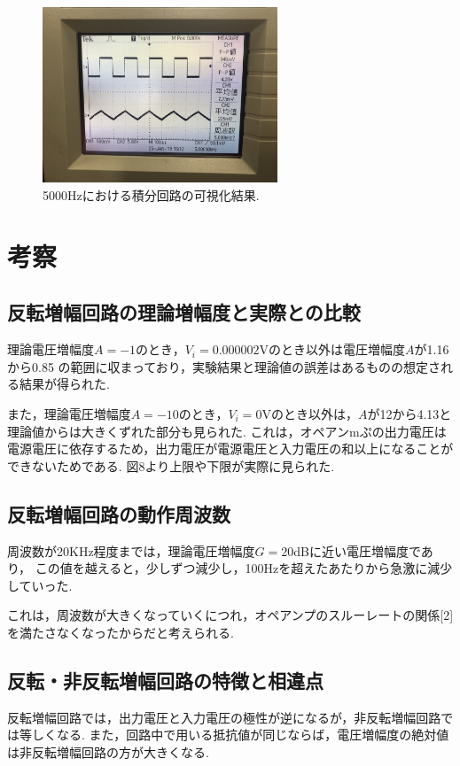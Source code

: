 \documentclass[twocolumn, 10pt,a4j]{jsarticle}
\begin{document}
        \begin{figure}[]
          \begin{center}
              \includegraphics[width=7cm]{../img/result_sekibun_5000Hz.jpg}
              \caption{5000Hzにおける積分回路の可視化結果.}
          \end{center}
        \end{figure}

\section{考察}
      \subsection{反転増幅回路の理論増幅度と実際との比較}
        理論電圧増幅度$A=-1$のとき，$V_{i} = 0.000002$Vのとき以外は電圧増幅度$A$が1.16から0.85
        の範囲に収まっており，実験結果と理論値の誤差はあるものの想定される結果が得られた.

        また，理論電圧増幅度$A=-10$のとき，$V_{i} = 0$Vのとき以外は，$A$が12から4.13と理論値からは大きくずれた部分も見られた.
        これは，オペアンmぷの出力電圧は電源電圧に依存するため，出力電圧が電源電圧と入力電圧の和以上になることができないためである.
        図8より上限や下限が実際に見られた. 

      \subsection{反転増幅回路の動作周波数}
        周波数が20KHz程度までは，理論電圧増幅度$G = 20$dBに近い電圧増幅度であり，
        この値を越えると，少しずつ減少し，100Hzを超えたあたりから急激に減少していった.


        これは，周波数が大きくなっていくにつれ，オペアンプのスルーレートの関係[2]を満たさなくなったからだと考えられる.

      \subsection{反転・非反転増幅回路の特徴と相違点}
        反転増幅回路では，出力電圧と入力電圧の極性が逆になるが，非反転増幅回路では等しくなる.
        また，回路中で用いる抵抗値が同じならば，電圧増幅度の絶対値は非反転増幅回路の方が大きくなる.
\end{document}
